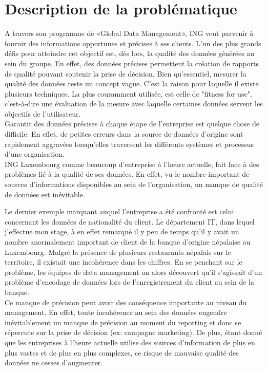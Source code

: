 \documentclass[a4paper, 12pt, french]{article}
\begin{document}
\section{Description de la problématique}

A travers son programme de «Global Data Management», ING veut parvenir à fournir des informations opportunes et précises à ses clients. L’un des plus grands défis pour atteindre cet objectif est, dès lors, la qualité des données générées au sein du groupe. En effet, des données précises permettent la création de rapports de qualité pouvant soutenir la prise de décision. Bien qu’essentiel, mesurer la qualité des données reste un concept vague. C'est la raison pour laquelle il existe plusieurs techniques. La plus couramment utilisée, est celle de "fitness for use", c'est-à-dire une évaluation de la mesure avec laquelle certaines données servent les objectifs de l’utilisateur. \\

Garantir des données précises à chaque étape de l'entreprise est quelque chose de difficile. En effet, de petites erreurs dans la source de données d'origine sont rapidement aggravées lorsqu'elles traversent les différents systèmes et processus d’une organisation. \\ 

ING Luxembourg comme beaucoup d’entreprise à l’heure actuelle, fait face à des problèmes lié à la qualité de ses données. En effet, vu le nombre important de sources d’informations disponibles au sein de l'organisation, un manque de qualité de données est inévitable. 

Le dernier exemple marquant auquel l'entreprise a été confronté est celui concernant les données de nationalité du client. Le département IT, dans lequel j’effectue mon stage, à en effet remarqué il y peu de temps qu’il y avait un nombre anormalement important de client de la banque d’origine népalaise au Luxembourg. Malgré la présence de plusieurs restaurants népalais sur le territoire, il existait une incohérence dans les chiffres. En se penchant sur le problème, les équipes de data management on alors découvert qu’il s’agissait d’un problème d’encodage de données lors de l’enregistrement du client au sein de la banque. \\

Ce manque de précision peut avoir des conséquence importante au niveau du management. En effet, toute incohérence au sein des données engendre inévitablement un manque de précision au moment du reporting et donc se répercute sur la prise de décision (ex: campagne marketing). De plus, étant donné que les entreprises à l'heure actuelle utilise des sources d'information de plus en plus vastes et de plus en plus complexes, ce risque de mauvaise qualité des données ne cesses d'augmenter. \\
\end{document}
